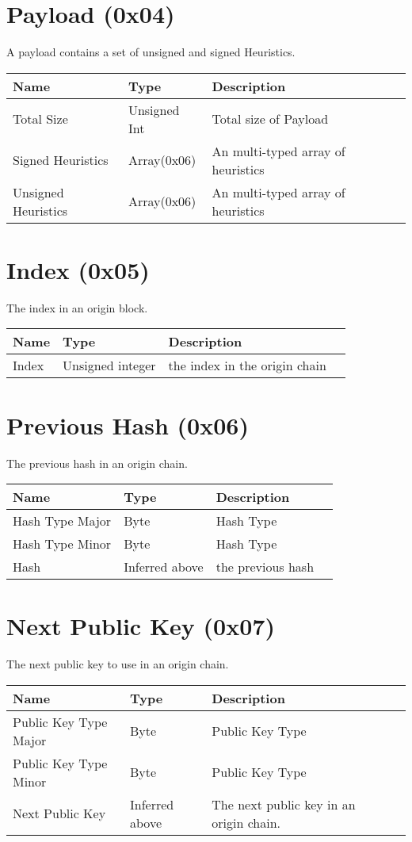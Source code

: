 \documentclass[11pt]{article}
\begin{document}
\section{Payload (0x04)}
A payload contains a set of unsigned and signed Heuristics.
\begin{center}
\begin{tabular}{ |l|l|l|l| } 
\hline
\textbf{Name} & \textbf{Type} & \textbf{Description}\\
\hline
Total Size & Unsigned Int & Total size of Payload \\ 
Signed Heuristics & Array(0x06) & An multi-typed array of heuristics\\  
Unsigned Heuristics & Array(0x06) & An multi-typed array of heuristics\\  

 
\hline
\end{tabular}
\end{center}
\section{Index (0x05)}
The index in an origin block.
\begin{center}
\begin{tabular}{ |l|l|l|l| } 
\hline
\textbf{Name} & \textbf{Type} & \textbf{Description}\\
\hline
Index & Unsigned integer & the index in the origin chain\\  
\hline
\end{tabular}
\end{center}
\section{Previous Hash (0x06)}
The previous hash in an origin chain.
\begin{center}
\begin{tabular}{ |l|l|l|l| } 
\hline
\textbf{Name} & \textbf{Type} & \textbf{Description}\\
\hline
Hash Type Major & Byte & Hash Type \\ 
Hash Type Minor & Byte & Hash Type\\ 
Hash & Inferred above & the previous hash\\  
\hline
\end{tabular}
\end{center}
\section{Next Public Key (0x07)}
The next public key to use in an origin chain.
\begin{center}
\begin{tabular}{ |l|l|l|l| } 
\hline
\textbf{Name} & \textbf{Type} & \textbf{Description}\\
\hline
Public Key Type Major & Byte & Public Key Type \\ 
Public Key Type Minor & Byte & Public Key Type\\ 
Next Public Key & Inferred above & The next public key in an origin chain.\\  
\hline
\end{tabular}
\end{center}
\end{document}
